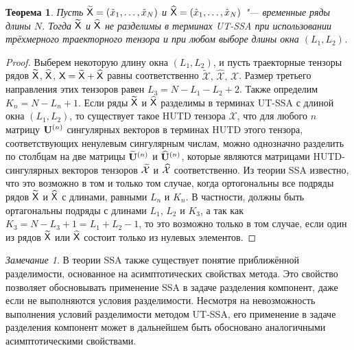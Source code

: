 \documentclass[specialist,
  substylefile = spbu.rtx,
subf,href,colorlinks=true, 12pt]{disser}
\theoremstyle{plain}
\newtheorem{theorem}{Теорема}[section]
\theoremstyle{definition}
\theoremstyle{remark}
\newtheorem{remark}{Замечание}[section]
\def\newdecomp/{HUTD}
\def\newtssa/{UT-SSA}
\begin{document}
\begin{theorem}
  \label{theorem:ut-ssa-no-separability}
  Пусть $\widetilde{\mathsf{X}}=(\tilde{x}_1,\ldots , \tilde{x}_N)$ и
  $\widehat{\mathsf{X}}=(\hat{x}_1,\ldots , \hat{x}_N)$ "--- временные
  ряды длины $N$.
  Тогда $\widetilde{\mathsf{X}}$ и $\widehat{\mathsf{X}}$ не разделимы в терминах
  \newtssa/ при использовании трёхмерного траекторного тензора и при
  любом выборе длины окна $(L_1, L_2)$.
\end{theorem}
\begin{proof}
  Выберем некоторую длину окна $(L_1, L_2)$, и пусть траекторные
  тензоры рядов $\widetilde{\mathsf{X}}$, $\widehat{\mathsf{X}}$, $\mathsf{X} =
  \widetilde{\mathsf{X}} + \widehat{\mathsf{X}}$ равны соответственно
  $\widetilde{\mathcal{X}},\, \widehat{\mathcal{X}},\, \mathcal{X}$.
  Размер третьего направления этих тензоров равен $L_3 = N - L_1 - L_2 + 2$.
  Также определим $K_n = N - L_n + 1$.
  Если ряды $\widetilde{\mathsf{X}}$ и $\widehat{\mathsf{X}}$ разделимы в терминах
  \newtssa/ с длиной окна $(L_1, L_2)$, то существует такое \newdecomp/
  тензора $\mathcal{X}$, что для любого $n$ матрицу $\mathbf{U}^{(n)}$
  сингулярных векторов в терминах \newdecomp/ этого
  тензора, соответствующих ненулевым сингулярным числам,
  можно однозначно разделить по столбцам на две матрицы
  $\widetilde{\mathbf{U}}^{(n)}$ и $\widehat{\mathbf{U}}^{(n)}$, которые являются
  матрицами \newdecomp/-сингулярных векторов тензоров
  $\widetilde{\mathcal{X}}$ и $\widehat{\mathcal{X}}$ соответственно.
  Из теории SSA известно, что это возможно в том и только том случае,
  когда ортогональны все подряды рядов $\widetilde{\mathsf{X}}$ и
  $\widehat{\mathsf{X}}$ с длинами, равными $L_n$ и $K_n$.
  В частности, должны быть ортагональны подряды с длинами $L_1$,
  $L_2$ и $K_3$, а так как $K_3 = N - L_3 + 1 = L_1 + L_2 - 1$, то
  это возможно только
  в том случае, если один из рядов $\widetilde{\mathsf{X}}$ или
  $\widehat{\mathsf{X}}$ состоит только из нулевых элементов.
\end{proof}

\begin{remark}\label{remark:approx-utssa-separability}
  В теории SSA также существует понятие приближённой разделимости,
  основанное на асимптотических свойствах метода. Это свойство
  позволяет обосновывать применение SSA в задаче разделения
  компонент, даже если не выполняются условия разделимости.
  Несмотря на невозможность выполнения условий разделимости методом
  \newtssa/, его применение в задаче разделения компонент может в
  дальнейшем быть обосновано аналогичными асимптотическими свойствами.
\end{remark}
\end{document}
